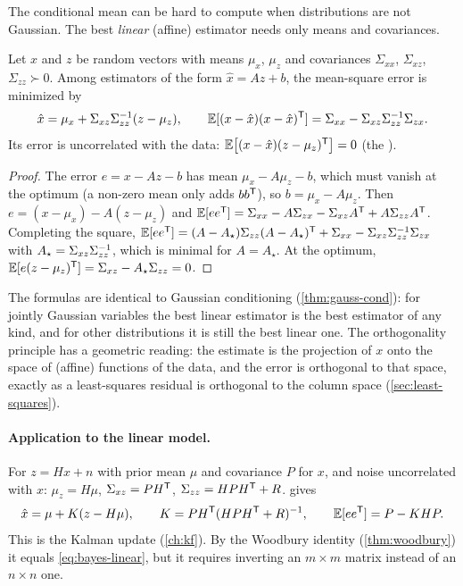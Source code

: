 The conditional mean can be hard to compute when distributions are not Gaussian. The best \emph{linear} (affine) estimator needs only means
and covariances.

\begin{theorem}
\label{thm:lmmse}
Let $x$ and $z$ be random vectors with means $\mu_x$, $\mu_z$ and covariances $\Sigma_{xx}$, $\Sigma_{xz}$, $\Sigma_{zz} \succ 0$. Among estimators of the form
$\hat x = Az + b$, the mean-square error is minimized by
\begin{equation}
  \hat x = \mu_x + \Sigma_{xz}\Sigma_{zz}^{-1}(z - \mu_z),
  \qquad \mathbb{E}[(x - \hat x)(x - \hat x)^{\mathsf{T}}] = \Sigma_{xx} - \Sigma_{xz}\Sigma_{zz}^{-1}\Sigma_{zx} .
\end{equation}
Its error is uncorrelated with the data: $\mathbb{E}\big[(x - \hat x)(z - \mu_z)^{\mathsf{T}}\big] = 0$ (the ).
\end{theorem}
\begin{proof}
The error $e = x - Az - b$ has mean $\mu_x - A\mu_z - b$, which must vanish at the optimum (a non-zero mean only adds $bb^{\mathsf{T}}$), so $b = \mu_x - A\mu_z$. Then
$e = (x - \mu_x) - A(z - \mu_z)$ and $\mathbb{E}[ee^{\mathsf{T}}] = \Sigma_{xx} - A\Sigma_{zx} - \Sigma_{xz}A^{\mathsf{T}} + A\Sigma_{zz}A^{\mathsf{T}}$. Completing the square,
$\mathbb{E}[ee^{\mathsf{T}}] = (A - A_\star)\Sigma_{zz}(A - A_\star)^{\mathsf{T}} + \Sigma_{xx} - \Sigma_{xz}\Sigma_{zz}^{-1}\Sigma_{zx}$ with $A_\star = \Sigma_{xz}\Sigma_{zz}^{-1}$, which is minimal for $A = A_\star$. At the
optimum, $\mathbb{E}[e(z - \mu_z)^{\mathsf{T}}] = \Sigma_{xz} - A_\star\Sigma_{zz} = 0$.
\end{proof}

The formulas are identical to Gaussian conditioning (\cref{thm:gauss-cond}): for jointly Gaussian variables the best linear estimator is the best
estimator of any kind, and for other distributions it is still the best linear one. The orthogonality principle has a geometric reading: the
estimate is the projection of $x$ onto the space of (affine) functions of the data, and the error is orthogonal to that space, exactly as a
least-squares residual is orthogonal to the column space (\cref{sec:least-squares}).

\paragraph{Application to the linear model.} For $z = Hx + n$ with prior mean $\mu$ and covariance $P$ for $x$, and noise uncorrelated with $x$:
$\mu_z = H\mu$, $\Sigma_{xz} = PH^{\mathsf{T}}$, $\Sigma_{zz} = HPH^{\mathsf{T}} + R$.  gives
\begin{equation}
  \hat x = \mu + K(z - H\mu), \qquad K = PH^{\mathsf{T}}(HPH^{\mathsf{T}} + R)^{-1}, \qquad \mathbb{E}[ee^{\mathsf{T}}] = P - KHP .
  \label{eq:lmmse-update}
\end{equation}
This is the Kalman update (\cref{ch:kf}). By the Woodbury identity (\cref{thm:woodbury}) it equals \eqref{eq:bayes-linear}, but it requires
inverting an $m\times m$ matrix instead of an $n\times n$ one.

